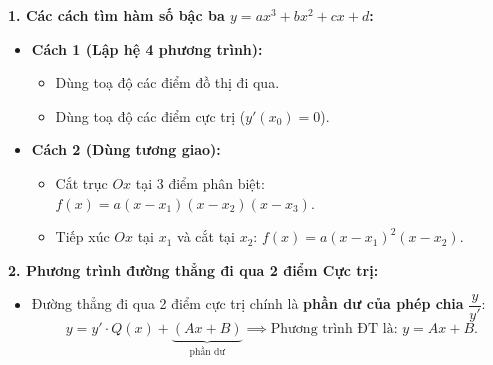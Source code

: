 \documentclass[12pt,a4paper]{article}
\begin{document}
\begin{theorybox}
    \textbf{1. Các cách tìm hàm số bậc ba $y = ax^3 + bx^2 + cx + d$:}
    \begin{itemize}\setlength{\itemsep}{3pt}
        \item \textbf{Cách 1 (Lập hệ 4 phương trình):}
        \begin{itemize}\setlength{\itemsep}{2pt}
            \item Dùng toạ độ các điểm đồ thị đi qua.
            \item Dùng toạ độ các điểm cực trị ($y'(x_0) = 0$).
        \end{itemize}
        \item \textbf{Cách 2 (Dùng tương giao):}
        \begin{itemize}\setlength{\itemsep}{2pt}
            \item Cắt trục $Ox$ tại 3 điểm phân biệt: $f(x) = a(x - x_1)(x - x_2)(x - x_3)$.
            \item Tiếp xúc $Ox$ tại $x_1$ và cắt tại $x_2$: $f(x) = a(x - x_1)^2(x - x_2)$.
        \end{itemize}
    \end{itemize}

    \vspace{0.1cm}
    \textbf{2. Phương trình đường thẳng đi qua 2 điểm Cực trị:}
    \begin{itemize}\setlength{\itemsep}{3pt}
        \item Đường thẳng đi qua 2 điểm cực trị chính là \textbf{phần dư của phép chia} $\dfrac{y}{y'}$:
        \[
            y = y' \cdot Q(x) + \underbrace{(Ax + B)}_{\text{phần dư}} \implies \text{Phương trình ĐT là: } y = Ax + B.
        \]
    \end{itemize}
\end{theorybox}

\vspace{0.25cm}

\vspace{0.2cm}


\end{document}
